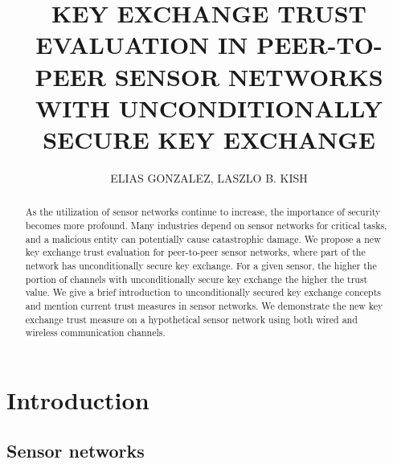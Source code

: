 \documentclass{ws-fnl2}
\begin{document}

\catchline{}{}{}{}{}


\title{KEY EXCHANGE TRUST EVALUATION IN PEER-TO-PEER SENSOR NETWORKS WITH UNCONDITIONALLY SECURE KEY EXCHANGE}

\author{\footnotesize ELIAS GONZALEZ, LASZLO B. KISH}

\address{Electrical and Computer Engineering, Texas A\&M University, 3128 TAMU\\
College Station, TX 77843-3128, United States of America\\
eliasg23@tamu.edu, laszlo.kish@ece.tamu.edu}

\maketitle

\begin{history}
\end{history}

\begin{abstract}
As the utilization of sensor networks continue to increase, the importance of security becomes more profound. Many industries depend on sensor networks for critical tasks, and a malicious entity can potentially cause catastrophic damage. We propose a new key exchange trust evaluation for peer-to-peer sensor networks, where part of the network has unconditionally secure key exchange. For a given sensor, the higher the portion of channels with unconditionally secure key exchange the higher the trust value. We give a brief introduction to unconditionally secured key exchange concepts and mention current trust measures in sensor networks. We demonstrate the new key exchange trust measure on a hypothetical sensor network using both wired and wireless communication channels.
\end{abstract}



\section{Introduction}

\subsection{Sensor networks}
\end{document}
